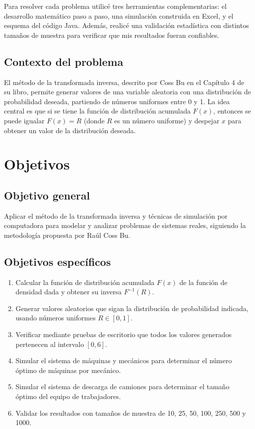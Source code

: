 \documentclass[12pt,a4paper]{article}
\begin{document}
Para resolver cada problema utilicé tres herramientas complementarias: el desarrollo matemático paso a paso, una simulación construida en Excel, y el esquema del código Java. Además, realicé una validación estadística con distintos tamaños de muestra para verificar que mis resultados fueran confiables.

\subsection{Contexto del problema}

El método de la transformada inversa, descrito por Coss Bu en el Capítulo 4 de su libro, permite generar valores de una variable aleatoria con una distribución de probabilidad deseada, partiendo de números uniformes entre 0 y 1. La idea central es que si se tiene la función de distribución acumulada $F(x)$, entonces se puede igualar $F(x) = R$ (donde $R$ es un número uniforme) y despejar $x$ para obtener un valor de la distribución deseada.

\newpage

\section{Objetivos}

\subsection{Objetivo general}

Aplicar el método de la transformada inversa y técnicas de simulación por computadora para modelar y analizar problemas de sistemas reales, siguiendo la metodología propuesta por Raúl Coss Bu.

\subsection{Objetivos específicos}

\begin{enumerate}
  \item Calcular la función de distribución acumulada $F(x)$ de la función de densidad dada y obtener su inversa $F^{-1}(R)$.
  \item Generar valores aleatorios que sigan la distribución de probabilidad indicada, usando números uniformes $R \in [0,1]$.
  \item Verificar mediante pruebas de escritorio que todos los valores generados pertenecen al intervalo $[0, 6]$.
  \item Simular el sistema de máquinas y mecánicos para determinar el número óptimo de máquinas por mecánico.
  \item Simular el sistema de descarga de camiones para determinar el tamaño óptimo del equipo de trabajadores.
  \item Validar los resultados con tamaños de muestra de 10, 25, 50, 100, 250, 500 y 1000.
\end{enumerate}
\end{document}
